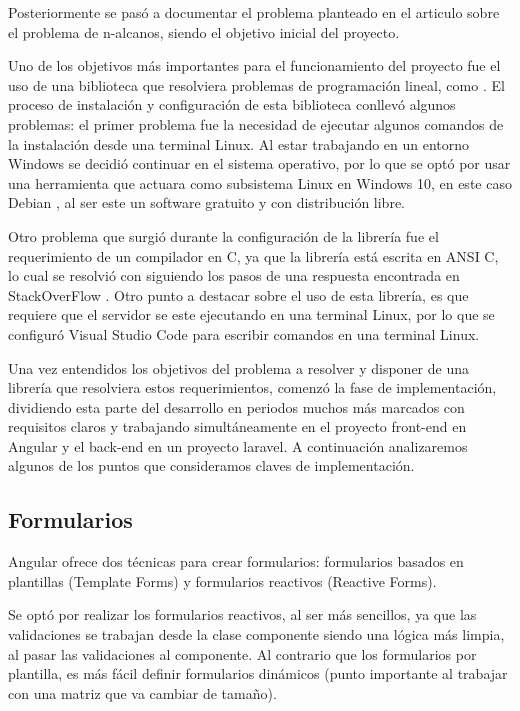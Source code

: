 Posteriormente  se pasó a documentar el problema planteado en el articulo \cite{problemn-alkanes2007} sobre el problema de n-alcanos, siendo el objetivo inicial del proyecto.

Uno de los objetivos más importantes para el funcionamiento del proyecto fue el uso de una biblioteca que resolviera problemas de programación lineal, como \cite{glpk:package}. El proceso de instalación y configuración de esta biblioteca conllevó algunos problemas: el primer problema fue la necesidad de ejecutar algunos comandos de la instalación desde una terminal Linux. Al estar trabajando en un entorno Windows se decidió continuar en el sistema operativo,  por lo que se optó  por usar una herramienta que actuara como subsistema  Linux en Windows 10, en este caso Debian \cite{debian}, al ser este un software gratuito y con distribución libre.

Otro problema que surgió durante la configuración de la librería fue el requerimiento de un compilador en C, ya que la librería está escrita en ANSI C, lo cual se resolvió con siguiendo los pasos de una respuesta encontrada en StackOverFlow \cite{stack:Compiler}. Otro punto a destacar sobre el uso de esta librería, es que requiere  que el servidor se este ejecutando en una terminal Linux, por lo que se configuró Visual Studio Code para escribir comandos en una terminal Linux.

Una vez entendidos los objetivos del problema a resolver y disponer de una librería que resolviera estos requerimientos, comenzó la fase  de implementación, dividiendo esta parte del desarrollo en periodos muchos más marcados con requisitos claros y trabajando simultáneamente en el proyecto front-end en Angular y el back-end en un proyecto laravel. A continuación analizaremos algunos de los puntos que consideramos claves de implementación.

\subsection{Formularios}

Angular ofrece dos técnicas para crear formularios: formularios basados en plantillas (Template Forms) y formularios reactivos (Reactive Forms). 

Se optó por realizar los formularios  reactivos, al ser más sencillos, ya que las validaciones se trabajan desde la clase componente siendo  una lógica más limpia, al pasar las validaciones al componente. Al contrario que los formularios por plantilla, es más fácil definir formularios dinámicos (punto importante al trabajar con una matriz que va cambiar de tamaño).

